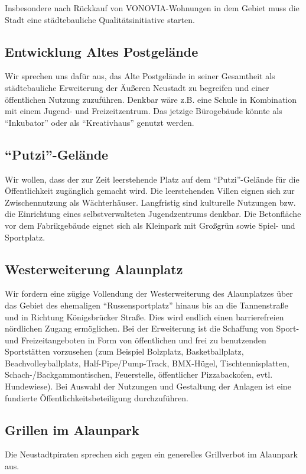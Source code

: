 \documentclass[a4paper, 11pt]{article}
\begin{document}
Insbesondere nach Rückkauf von VONOVIA-Wohnungen in dem Gebiet muss die Stadt eine städtebauliche Qualitätsinitiative starten.


\subsection{Entwicklung Altes Postgelände}
Wir sprechen uns dafür aus, das Alte Postgelände in seiner Gesamtheit als städtebauliche Erweiterung der Äußeren Neustadt zu begreifen und einer öffentlichen Nutzung zuzuführen. Denkbar wäre z.B. eine Schule in Kombination mit einem Jugend- und Freizeitzentrum. Das jetzige Bürogebäude könnte als ``Inkubator'' oder als ``Kreativhaus'' genutzt werden.


\subsection{``Putzi''-Gelände}
Wir wollen, dass der zur Zeit leerstehende Platz auf dem ``Putzi''-Gelände für die Öffentlichkeit zugänglich gemacht wird. Die leerstehenden Villen eignen sich zur Zwischennutzung als Wächterhäuser. Langfristig sind kulturelle Nutzungen bzw. die Einrichtung eines selbstverwalteten Jugendzentrums denkbar. Die Betonfläche vor dem Fabrikgebäude eignet sich als Kleinpark mit Großgrün sowie Spiel- und Sportplatz.


\subsection{Westerweiterung Alaunplatz}
Wir fordern eine zügige Vollendung der Westerweiterung des Alaunplatzes über das Gebiet des ehemaligen ``Russensportplatz'' hinaus bis an die Tannenstraße und in Richtung Königsbrücker Straße. Dies wird endlich einen barrierefreien nördlichen Zugang ermöglichen. Bei der Erweiterung ist die Schaffung von Sport- und Freizeitangeboten in Form von öffentlichen und frei zu benutzenden Sportstätten vorzusehen (zum Beispiel Bolzplatz, Basketballplatz, Beachvolleyballplatz, Half-Pipe/Pump-Track, BMX-Hügel, Tischtennisplatten, Schach-/Backgammontischen, Feuerstelle, öffentlicher Pizzabackofen, evtl. Hundewiese). Bei Auswahl der Nutzungen und Gestaltung der Anlagen ist eine fundierte Öffentlichkeitsbeteiligung durchzuführen.


\subsection{Grillen im Alaunpark}
Die Neustadtpiraten sprechen sich gegen ein generelles Grillverbot im Alaunpark aus.
\end{document}
